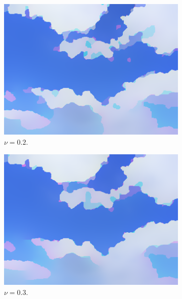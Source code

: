 \documentclass[abstracton]{scrreprt}
\begin{document}
            \begin{figure}[!ht]
                \centering
                \begin{subfigure}[b]{0.16\textwidth}
                    \includegraphics[width=\textwidth]{img/segmentation/rt/02blue.png}
                    \caption{$\nu = 0.2$.}
                \end{subfigure}
                \begin{subfigure}[b]{0.16\textwidth}
                    \includegraphics[width=\textwidth]{img/segmentation/rt/03blue.png}
                    \caption{$\nu = 0.3$.}
                \end{subfigure}
                \begin{subfigure}[b]{0.16\textwidth}

\end{subfigure}
\end{figure}
\end{document}

